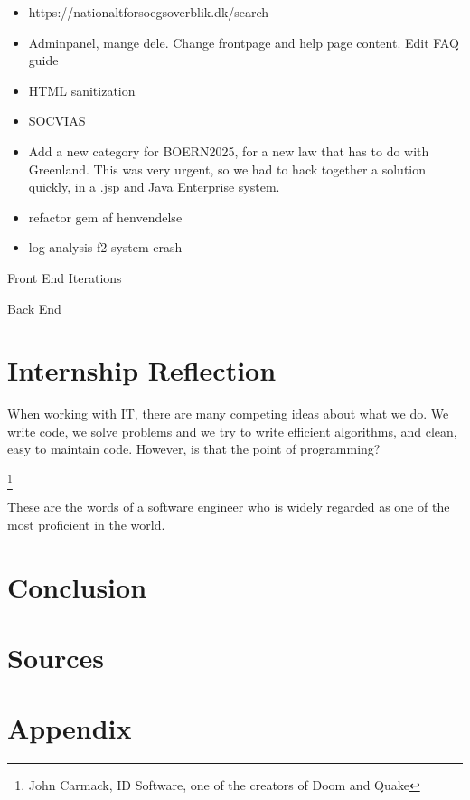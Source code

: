 \documentclass[../main.tex]{subfiles}
\begin{document}
\begin{itemize}
    \item https://nationaltforsoegsoverblik.dk/search 
    \item Adminpanel, mange dele. Change frontpage and help page content. Edit FAQ guide 
    \item HTML sanitization 
    \item SOCVIAS 
    \item Add a new category for BOERN2025, for a new law that has to do with Greenland. This was very urgent, so we had to hack together a solution quickly, in a .jsp and Java Enterprise system. 
    \item refactor gem af henvendelse
    \item log analysis f2 system crash
\end{itemize}


Front End Iterations 

Back End 

\section{Internship Reflection}
\label{sec:reflection}

When working with IT, there are many competing ideas about what we do. We write
code, we solve problems and we try to write efficient algorithms, and clean, easy to maintain code. However, is that the point of programming? 

\footnote{John Carmack, ID Software, one of the creators of Doom and Quake}

These are the words of a software engineer who is  widely regarded as one of the most proficient in the world.


\section{Conclusion}
\label{sec:conclusion}


\section{Sources}
\label{sec:sources}

\section{Appendix}
\label{sec:appendix}
\end{document}
